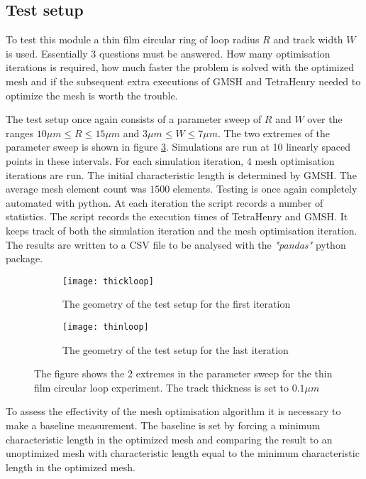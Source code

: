 \subsection{Test setup}
To test this module a thin film circular ring of loop radius $R$ and track width $W$ is used. Essentially 3 questions must be answered. How many optimisation iterations is required, how much faster the problem is solved with the optimized mesh and if the subsequent extra executions of GMSH and TetraHenry needed to optimize the mesh is worth the trouble. \par
The test setup once again consists of a parameter sweep of $R$ and $W$ over the ranges $10 \mu m \le R \le 15 \mu m $ and $  3 \mu m \le W \le7\mu m$. The two extremes of the parameter sweep is shown in figure \ref{fig:testloop}. Simulations are run at 10 linearly spaced points in these intervals. For each simulation iteration, 4 mesh optimisation iterations are run. The initial characteristic length is determined by GMSH. The average mesh element count was $1500$ elements. Testing is once again completely automated with python. At each iteration the script records a number of statistics. The script records the execution times of TetraHenry and GMSH. It keeps track of both the simulation iteration and the mesh optimisation iteration. The results are written to a CSV file to be analysed with the \textit{"pandas"} python package. 
\begin{figure}[H]
    \centering
    \begin{subfigure}[b]{0.48\textwidth}
        \centering
        \texttt{[image: thickloop]}
        \caption{The geometry of the test setup for the first iteration}
        \label{fig:thickloop}
    \end{subfigure}
    \hfill
    \begin{subfigure}[b]{0.48\textwidth}
        \centering
        \texttt{[image: thinloop]}
        \caption{The geometry of the test setup for the last iteration}
        \label{fig:thinloop}
    \end{subfigure}
    \caption{The figure shows the 2 extremes in the parameter sweep for the thin film circular loop experiment. The track thickness is set to $0.1 \mu m$}
    \label{fig:testloop}
\end{figure}
To assess the effectivity of the mesh optimisation algorithm it is necessary to make a baseline measurement. The baseline is set by forcing a minimum characteristic length in the optimized mesh and comparing the result to an unoptimized mesh with characteristic length equal to the minimum characteristic length in the optimized mesh. \par


